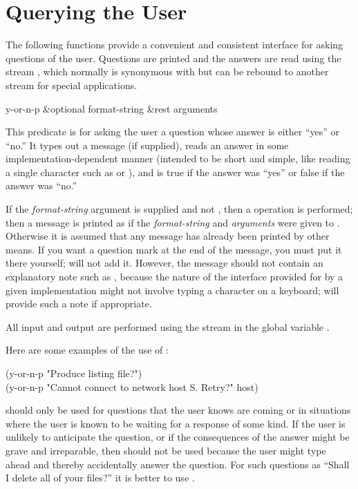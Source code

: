 \section{Querying the User}

The following functions provide a convenient and consistent interface for
asking questions of the user.  Questions are printed and the answers are
read using the stream , which normally is synonymous with
 but can be rebound to another stream for special
applications.

\begin{defun}[Function]
y-or-n-p &optional format-string &rest arguments

This predicate is for asking the user a question whose answer is either
``yes'' or ``no.''  It types out a message (if supplied), reads an answer
in some implementation-dependent manner (intended to be short and simple,
like reading a single character such as  or ), and is
true if the answer was ``yes'' or false if the answer was ``no.''

If the \emph{format-string} argument is supplied and not {\false},
then a  operation is performed; then
a message is printed as if the \emph{format-string} and \emph{arguments}
were given to .
Otherwise it is assumed that any message has already been printed
by other means.
If you want a question mark at the end of the message,
you must put it there yourself;  will not add it.
However, the message should not contain an explanatory note such
as , because the nature of the interface provided for
 by a given implementation might not involve typing a
character on a keyboard;  will provide such a note
if appropriate.

All input and output are performed using the stream in the global
variable .

Here are some examples of the use of :
\begin{lisp}
(y-or-n-p "Produce listing file?") \\
(y-or-n-p "Cannot connect to network host {\Xtilde}S.  Retry?" host)
\end{lisp}

 should only be used for questions that the user knows
are coming or in situations where the user is known to be waiting for
a response of some kind.
If the user is unlikely to anticipate the question,
or if the consequences of the answer might be grave and irreparable,
then  should not be used because the user might type ahead
and thereby accidentally answer the question.
For such questions as ``Shall I delete all of your files?'' it is better to use
.
\end{defun}

